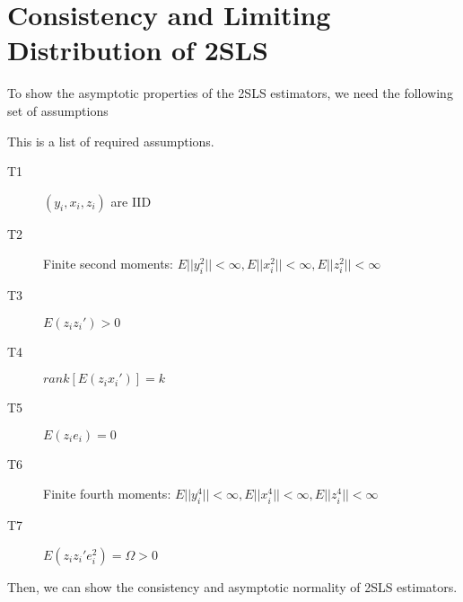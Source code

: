 \section{Consistency and Limiting Distribution of 2SLS}
To show the asymptotic properties of the 2SLS estimators, we need the following set of assumptions
\begin{mdframed}[backgroundcolor=blue!5] 
\begin{assumption} This is a list of required assumptions. 
\begin{description}
\item[T1] $(y_i, x_i, z_i)$ are IID
\item[T2] Finite second moments: $E||y_i^2||<\infty, E||x_i^2||<\infty, E||z_i^2||<\infty$
\item[T3] $E(z_iz_i')>0$
\item[T4] $rank[E(z_ix_i')]=k$
\item[T5] $E(z_ie_i)=0$
\item[T6] Finite fourth moments: $E||y_i^4||<\infty, E||x_i^4||<\infty, E||z_i^4||<\infty$
\item[T7] $E(z_iz_i'e_i^2)=\Omega>0$
\end{description}
\end{assumption}
\end{mdframed}\par
Then, we can show the consistency and asymptotic normality of 2SLS estimators. 
